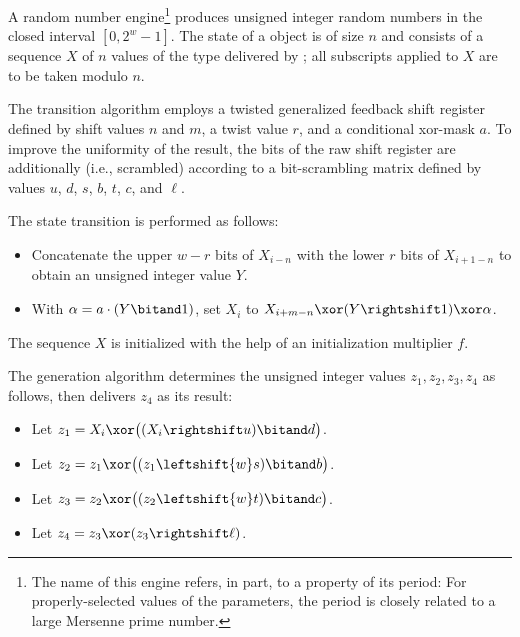 \pnum
A  random number
engine\footnote{The name of this engine refers, in part, to a property of its period:
 For properly-selected values of the parameters,
 the period is closely related to a large Mersenne prime number.}
produces unsigned integer random numbers
in the closed interval $[0,2^w-1]$.
The
%
%
state
of a  object 
is of size $n$
and consists of a sequence $X$
of $n$ values of the type delivered by ;
all subscripts applied to $X$ are to be taken modulo $n$.

\pnum
The transition algorithm%
%
employs a twisted generalized feedback shift register
defined by shift values $n$ and $m$, a twist value $r$,
and a conditional xor-mask $a$.
To improve the uniformity of the result,
the bits of the raw shift register are additionally 
(i.e., scrambled) according to a bit-scrambling matrix
defined by values $u$, $d$, $s$, $b$, $t$, $c$, and $\ell$.

The state transition is performed as follows:
\begin{itemize}
 \item
   Concatenate
     the upper $w-r$ bits of $X_{i-n}$
   with
     the lower $r$ bits of $X_{i+1-n}$
   to obtain an unsigned integer value $Y$.
 \item
   With $\alpha = a \cdot (Y \bitand 1)$,
   set $X_i$ to
     $X_{i+m-n} \xor (Y \rightshift 1) \xor \alpha$.
\end{itemize}
The sequence $X$ is initialized
with the help of an initialization multiplier $f$.

\pnum
The generation algorithm%
%
 determines the unsigned integer values $z_1, z_2, z_3, z_4$ as follows,
 then delivers $z_4$ as its result:
\begin{itemize}
 \item
   Let $z_1 = X_i \xor \bigl(( X_i \rightshift u ) \bitand d\bigr)$.
 \item
   Let $z_2 = z_1 \xor \bigl( (z_1 \leftshift{w} s) \bitand b \bigr)$.
 \item
   Let $z_3 = z_2 \xor \bigl( (z_2 \leftshift{w} t) \bitand c \bigr)$.
 \item
   Let $z_4 = z_3 \xor ( z_3 \rightshift \ell )$.
\end{itemize}

